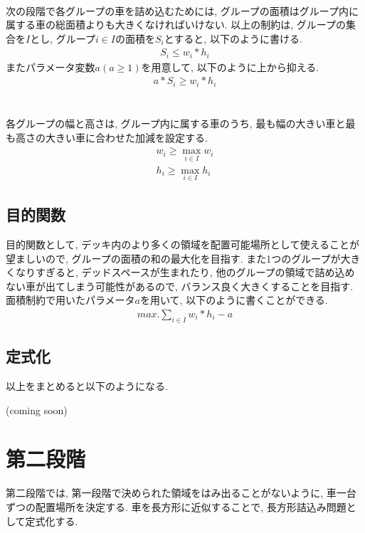 \\
次の段階で各グループの車を詰め込むためには, グループの面積はグループ内に属する車の総面積よりも大きくなければいけない. 
以上の制約は, グループの集合を$I$とし, グループ$i \in I$の面積を$S_i$とすると, 以下のように書ける. \\
\begin{eqnarray}
    S_i \leq w_i*h_i
\end{eqnarray}
またパラメータ変数$a (a \geq 1)$を用意して, 以下のように上から抑える. 
\begin{eqnarray}
    a*S_i \geq w_i*h_i
\end{eqnarray}\\

\\
各グループの幅と高さは, グループ内に属する車のうち, 最も幅の大きい車と最も高さの大きい車に合わせた加減を設定する. \\
\begin{eqnarray}
    w_i \geq \max_{i \in I} w_i \\
    h_i \geq \max_{i \in I} h_i
\end{eqnarray}

\subsection{目的関数}
目的関数として, デッキ内のより多くの領域を配置可能場所として使えることが望ましいので, グループの面積の和の最大化を目指す. 
また1つのグループが大きくなりすぎると, デッドスペースが生まれたり, 他のグループの領域で詰め込めない車が出てしまう可能性があるので, バランス良く大きくすることを目指す. 
面積制約で用いたパラメータ$a$を用いて, 以下のように書くことができる. \\
\begin{eqnarray}
    max. \sum_{i \in I} w_i*h_i  - a
\end{eqnarray}
\subsection{定式化}
以上をまとめると以下のようになる. \\
\centerline{(coming soon)}

\section{第二段階}
第二段階では, 第一段階で決められた領域をはみ出ることがないように, 車一台ずつの配置場所を決定する. 
車を長方形に近似することで, 長方形詰込み問題として定式化する. 
